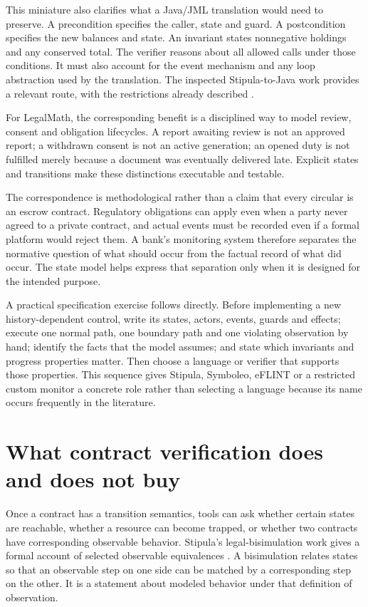 \documentclass[12pt,a4paper,oneside,openany]{book}
\begin{document}
This miniature also clarifies what a Java/JML translation would need to preserve.
A precondition specifies the caller, state and guard. A postcondition specifies
the new balances and state. An invariant states nonnegative holdings and any
conserved total. The verifier reasons about all allowed calls under those
conditions. It must also account for the event mechanism and any loop abstraction
used by the translation. The inspected Stipula-to-Java work provides a relevant
route, with the restrictions already described \citep{stipulakey2025}.

For LegalMath, the corresponding benefit is a disciplined way to model review,
consent and obligation lifecycles. A report awaiting review is not an approved
report; a withdrawn consent is not an active generation; an opened duty is not
fulfilled merely because a document was eventually delivered late. Explicit
states and transitions make these distinctions executable and testable.

The correspondence is methodological rather than a claim that every circular is
an escrow contract. Regulatory obligations can apply even when a party never
agreed to a private contract, and actual events must be recorded even if a formal
platform would reject them. A bank's monitoring system therefore separates the
normative question of what should occur from the factual record of what did
occur. The state model helps express that separation only when it is designed
for the intended purpose.

A practical specification exercise follows directly. Before implementing a new
history-dependent control, write its states, actors, events, guards and effects;
execute one normal path, one boundary path and one violating observation by hand;
identify the facts that the model assumes; and state which invariants and progress
properties matter. Then choose a language or verifier that supports those
properties. This sequence gives Stipula, Symboleo, eFLINT or a restricted custom
monitor a concrete role rather than selecting a language because its name occurs
frequently in the literature.

\section{What contract verification does and does not buy}
\label{merge:M04:07}

\label{sec:languages-contractverification}
Once a contract has a transition semantics, tools can ask whether certain
states are reachable, whether a resource can become trapped, or whether two
contracts have corresponding observable behavior. Stipula's legal-bisimulation
work gives a formal account of selected observable equivalences
\citep[behavioral equivalence section]{stipula2021}. A bisimulation relates
states so that an observable step on one side can be matched by a corresponding
step on the other. It is a statement about modeled behavior under that
definition of observation.
\end{document}

